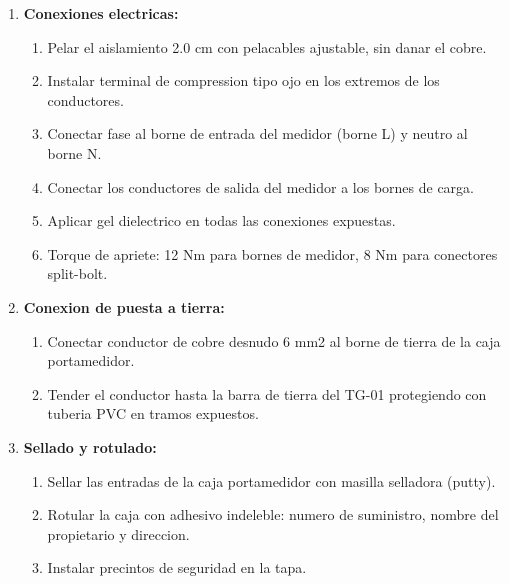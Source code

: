 \begin{enumerate}
  \begin{enumerate}
    \item Pasar guia de alambre galvanizado \#14 a traves de la tuberia.
    \item Fijar los conductores de fase (negro) y neutro (blanco) de 10 mm2 a la guia.
    \item Halar suavemente los conductores, evitando tirones bruscos que puedan danar el aislamiento.
    \item Dejar 0.50 m de conductor en cada extremo para conexiones.
  \end{enumerate}
  \item \textbf{Conexiones electricas:}
  \begin{enumerate}
    \item Pelar el aislamiento 2.0 cm con pelacables ajustable, sin danar el cobre.
    \item Instalar terminal de compression tipo ojo en los extremos de los conductores.
    \item Conectar fase al borne de entrada del medidor (borne L) y neutro al borne N.
    \item Conectar los conductores de salida del medidor a los bornes de carga.
    \item Aplicar gel dielectrico en todas las conexiones expuestas.
    \item Torque de apriete: 12 Nm para bornes de medidor, 8 Nm para conectores split-bolt.
  \end{enumerate}
  \item \textbf{Conexion de puesta a tierra:}
  \begin{enumerate}
    \item Conectar conductor de cobre desnudo 6 mm2 al borne de tierra de la caja portamedidor.
    \item Tender el conductor hasta la barra de tierra del TG-01 protegiendo con tuberia PVC en tramos expuestos.
  \end{enumerate}
  \item \textbf{Sellado y rotulado:}
  \begin{enumerate}
    \item Sellar las entradas de la caja portamedidor con masilla selladora (putty).
    \item Rotular la caja con adhesivo indeleble: numero de suministro, nombre del propietario y direccion.
    \item Instalar precintos de seguridad en la tapa.
  \end{enumerate}
\end{enumerate}

